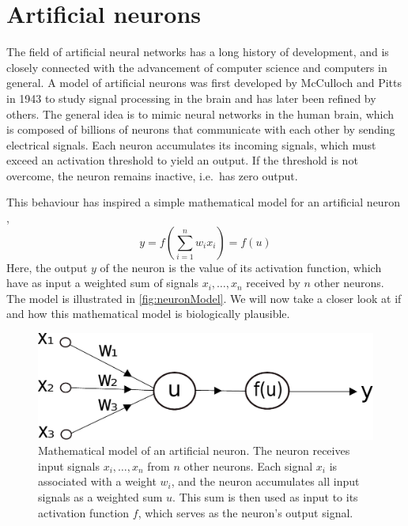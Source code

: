 \documentclass[twoside,english]{uiofysmaster}
\begin{document}
\section{Artificial neurons} \label{sec:ANN}
The field of artificial neural networks has a long history of development, and is closely connected with 
the advancement of computer science and computers in general. A model of artificial neurons 
was first developed by McCulloch and Pitts in 1943 \cite{McCulloch43} to study signal processing in the brain and 
has later been refined by others. The general idea is to mimic neural networks in the human brain, which
is composed of billions of neurons that communicate with each other by sending electrical signals. 
Each neuron accumulates its incoming signals, 
which must exceed an activation threshold to yield an output. If the threshold is not overcome, the neuron
remains inactive, i.e.\ has zero output.  

This behaviour has inspired a simple mathematical model for an artificial neuron \cite{Rojas96},
\begin{equation}
 y = f\left(\sum_{i=1}^n w_ix_i\right) = f(u)
 \label{artificialNeuron}
\end{equation}
Here, the output $y$ of the neuron is the value of its activation function, which have as input
a weighted sum of signals $x_i, \dots ,x_n$ received by $n$ other neurons.
The model is illustrated in \autoref{fig:neuronModel}. We will now take a closer look at if and how 
this mathematical model is biologically plausible.
\begin{figure}
 \centering
  \includegraphics[width=0.8\linewidth]{Figures/Theory/neuron.pdf}
  \caption{Mathematical model of an artificial neuron. The neuron receives input signals $x_i,\dots,x_n$ from
	   $n$ other neurons. Each signal $x_i$ is associated with a weight $w_i$, and the neuron accumulates
	   all input signals as a weighted sum $u$. This sum is then used as input to its activation function
	   $f$, which serves as the neuron's output signal.}
  \label{fig:neuronModel}
\end{figure}
\end{document}
